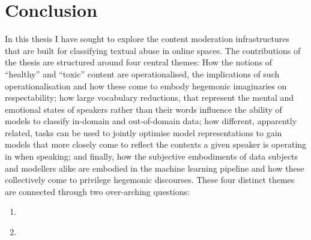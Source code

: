\ifpdf
    \graphicspath{{Chapter8/Figs/Raster/}{Chapter8/Figs/PDF/}{Chapter8/Figs/}}
\else
    \graphicspath{{Chapter8/Figs/Vector/}{Chapter8/Figs/}}
\fi

\chapter{Conclusion}\label{chap:conclusion}

In this thesis I have sought to explore the content moderation infrastructures that are built for classifying textual abuse in online spaces.
The contributions of the thesis are structured around four central themes:
How the notions of ``healthy'' and ``toxic'' content are operationalised, the implications of such operationalisation and how these come to embody hegemonic imaginaries on respectability;
how large vocabulary reductions, that represent the mental and emotional states of speakers rather than their words influence the ability of models to classify in-domain and out-of-domain data;
how different, apparently related, tasks can be used to jointly optimise model representations to gain models that more closely come to reflect the contexts a given speaker is operating in when speaking;
and finally, how the subjective embodiments of data subjects and modellers alike are embodied in the machine learning pipeline and how these collectively come to privilege hegemonic discourses.
These four distinct themes are connected through two over-arching  questions: 
\begin{center}
\begin{minipage}{0.9\textwidth}
\vspace{5mm}
    \begin{enumerate}[start=1, label={\textbf{RQ \roman*}}]
      \item\textit{}
      \item\textit{}
    \end{enumerate}
    \vspace{5mm}
\end{minipage}
\end{center}

